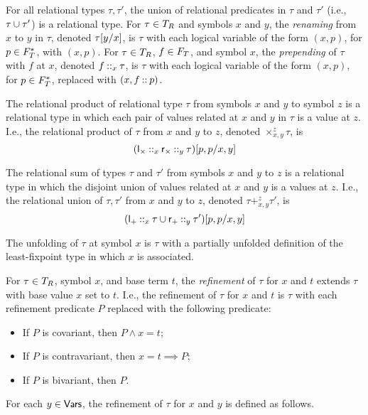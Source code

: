 For all relational types $\tau, \tau'$, the union of relational
predicates in $\tau$ and $\tau'$ (i.e., $\tau \union \tau'$) is a
relational type.
For $\tau \in \reltypes$ and symbols $x$ and $y$, the \emph{renaming}
from $x$ to $y$ in $\tau$, denoted $\replace{\tau}{x}{y}$, is $\tau$
with each logical variable of the form $(x, p)$, for $p \in \typepos$,
with $(x, p)$.
For $\tau \in \reltypes$, $f \in \typeposfield$, and symbol $x$, the
\emph{prepending} of $\tau$ with $f$ at $x$, denoted $f \cons_x \tau$,
is $\tau$ with each logical variable of the form $(x, p)$, for
$p \in \typepos$, replaced with $(x, f \cons p)$.

The relational product of relational type $\tau$ from symbols $x$ and
$y$ to symbol $z$ is a relational type in which each pair of values
related at $x$ and $y$ in $\tau$ is a value at $z$.
%
I.e., the relational product of $\tau$ from $x$ and $y$ to $z$,
denoted $\times_{x, y}^z \tau$, is
\[ \replace{ (\tyleftprod \cons_x \tyrightprod \cons_y \tau) }{ x, y }{ p, p }
\]

The relational sum of types $\tau$ and $\tau'$ from symbols $x$ and
$y$ to $z$ is a relational type in which the disjoint union of values
related at $x$ and $y$ is a values at $z$.
%
I.e., the relational union of $\tau, \tau'$ from $x$ and $y$ to $z$,
denoted $\tau +_{x, y}^z \tau'$, is
\[ \replace{ (\tyleftsum \cons_x \tau \union \tyrightsum \cons_y
    \tau')}{ x, y }{ p, p }
\]

%
The unfolding of $\tau$ at symbol $x$ is $\tau$ with a partially
unfolded definition of the least-fixpoint type in which $x$ is
associated.
%


For $\tau \in \reltypes$, symbol $x$, and base term $t$,
%
%
the \emph{refinement} of $\tau$ for $x$ and $t$ extends $\tau$ with
base value $x$ set to $t$.
%
I.e., the refinement of $\tau$ for $x$ and $t$ is $\tau$ with each
refinement predicate $P$ replaced with the following predicate:
%
\begin{itemize}
\item %
  If $P$ is covariant, then $P \land x = t$;
\item %
  If $P$ is contravariant, then $x = t \implies P$;
\item %
  If $P$ is bivariant, then $P$.
\end{itemize}
%
For each $y \in \vars$, the refinement of $\tau$ for $x$ and $y$ is
defined as follows.
%

